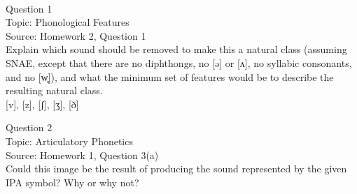 \documentclass[12pt]{article}
\begin{document}
\newpage

\begin{center}
\textbf{{\color{red}{\HUGE END OF EXAM}}}\\

\end{center}
\newpage

\begin{center}
\textbf{{\color{blue}{\HUGE START OF EXAM\\}}}

\textbf{{\color{blue}{\HUGE Student ID: empty\\}}}

\textbf{{\color{blue}{\HUGE 4:20\\}}}

\end{center}
\newpage

\begin{center}
\textbf{{\color{blue}{\HUGE START OF EXAM\\}}}

\textbf{{\color{blue}{\HUGE Student ID: 28926\\}}}

\textbf{{\color{blue}{\HUGE 4:30\\}}}

\end{center}
\newpage

{\large Question 1}\\

Topic: Phonological Features\\
Source: Homework 2, Question 1\\

Explain which sound should be removed to make this a natural class (assuming SNAE, except that there are no diphthongs, no [ə] or [ʌ], no syllabic consonants, and no [w̥]), and what the minimum set of features would be to describe the resulting natural class.\\

{[v]}, {[z]}, {[ʃ]}, {[ʒ]}, {[ð]}


\newpage

{\large Question 2}\\

Topic: Articulatory Phonetics\\
Source: Homework 1, Question 3(a)\\

Could this image be the result of producing the sound represented by the given IPA symbol? Why or why not?\\
\end{document}

